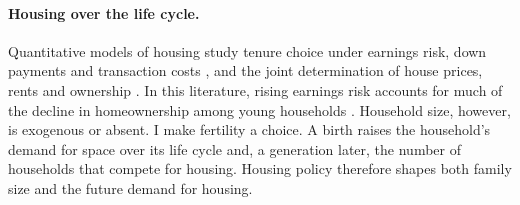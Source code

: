 \paragraph{Housing over the life cycle.}
Quantitative models of housing study tenure choice under earnings risk, down payments and transaction costs \citep{fisherGervaisHomeOwnership2011,halketVasudevSaving2014,boarGoreaMidriganLiquidity2022}, and the joint determination of house prices, rents and ownership \citep{kaplanMitmanViolanteHousing2020,greenwaldGurenCredit2025}. In this literature, rising earnings risk accounts for much of the decline in homeownership among young households \citep{fisherGervaisHomeOwnership2011,pazPardoHomeownership2024}. Household size, however, is exogenous or absent. I make fertility a choice. A birth raises the household's demand for space over its life cycle and, a generation later, the number of households that compete for housing. Housing policy therefore shapes both family size and the future demand for housing.
